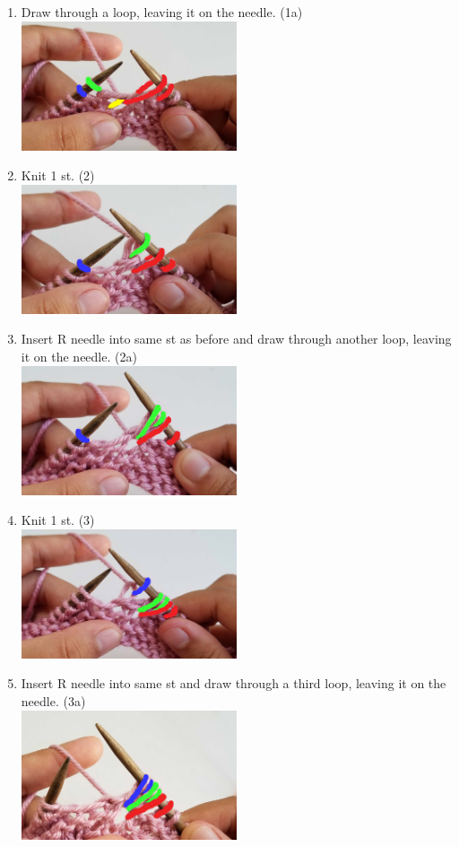 \documentclass[12pt]{article}
\begin{document}
\begin{multicols}{2}
\begin{enumerate}
\vfill
\columnbreak

\item Draw through a loop, leaving it on the needle. (1a) \\ \includegraphics[height=1.5in]{3.jpg}
\item Knit 1 st. (2) \\ \includegraphics[height=1.5in]{4_knit2.jpg}
\item Insert R needle into same st as before and draw through another loop, leaving it on the needle. (2a) \\ \includegraphics[height=1.5in]{5_loop2.jpg}
\item Knit 1 st. (3) \\ \includegraphics[height=1.5in]{6_knit3.jpg}

\vfill

\newpage


\item Insert R needle into same st and draw through a third loop, leaving it on the needle. (3a) \\ \includegraphics[height=1.5in]{7_loop3.jpg}


\end{enumerate}
\end{multicols}
\end{document}
